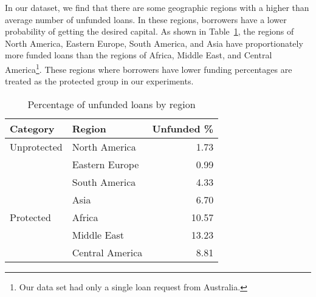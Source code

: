         In our dataset, we find that there are some geographic regions with a higher than average number of unfunded loans. In these regions, borrowers have a lower probability of getting the desired capital. As shown in Table~\ref{tab:unfunded}, the regions of North America, Eastern Europe, South America, and Asia have proportionately more funded loans than the regions of Africa, Middle East, and Central America\footnote{Our data set had only a single loan request from Australia.}. These regions where borrowers have lower funding percentages are treated as the protected group in our experiments.
        
        \begin{table}
            \centering
        \begin{tabular}{l|l|r}
            Category & Region & Unfunded \% \\ \hline
            Unprotected & North America & 1.73 \\
            & Eastern Europe & 0.99 \\
            & South America & 4.33 \\
            & Asia & 6.70 \\ \hline
            Protected & Africa & 10.57 \\
            & Middle East & 13.23 \\
            & Central America & 8.81 \\
        \end{tabular}
            \caption{Percentage of unfunded loans by region}
            \label{tab:unfunded}
        \end{table}
 




